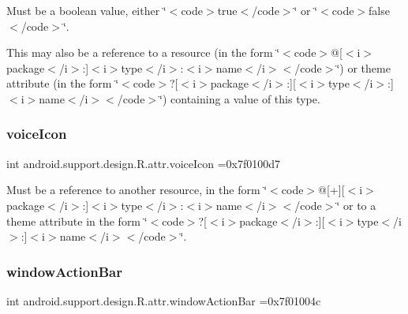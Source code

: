 Must be a boolean value, either \char`\"{}$<$code$>$true$<$/code$>$\char`\"{} or \char`\"{}$<$code$>$false$<$/code$>$\char`\"{}. 

This may also be a reference to a resource (in the form \char`\"{}$<$code$>$@\mbox{[}$<$i$>$package$<$/i$>$\+:\mbox{]}$<$i$>$type$<$/i$>$\+:$<$i$>$name$<$/i$>$$<$/code$>$\char`\"{}) or theme attribute (in the form \char`\"{}$<$code$>$?\mbox{[}$<$i$>$package$<$/i$>$\+:\mbox{]}\mbox{[}$<$i$>$type$<$/i$>$\+:\mbox{]}$<$i$>$name$<$/i$>$$<$/code$>$\char`\"{}) containing a value of this type. \mbox{\label{classandroid_1_1support_1_1design_1_1R_1_1attr_a52019590c44e770bbcf3702f5e7af367}} 
\subsubsection{\texorpdfstring{voice\+Icon}{voiceIcon}}
{\footnotesize\ttfamily int android.\+support.\+design.\+R.\+attr.\+voice\+Icon =0x7f0100d7\hspace{0.3cm}{\ttfamily [static]}}

Must be a reference to another resource, in the form \char`\"{}$<$code$>$@\mbox{[}+\mbox{]}\mbox{[}$<$i$>$package$<$/i$>$\+:\mbox{]}$<$i$>$type$<$/i$>$\+:$<$i$>$name$<$/i$>$$<$/code$>$\char`\"{} or to a theme attribute in the form \char`\"{}$<$code$>$?\mbox{[}$<$i$>$package$<$/i$>$\+:\mbox{]}\mbox{[}$<$i$>$type$<$/i$>$\+:\mbox{]}$<$i$>$name$<$/i$>$$<$/code$>$\char`\"{}. \mbox{\label{classandroid_1_1support_1_1design_1_1R_1_1attr_ad115fed13b20f5c7c7be738211784448}} 
\subsubsection{\texorpdfstring{window\+Action\+Bar}{windowActionBar}}
{\footnotesize\ttfamily int android.\+support.\+design.\+R.\+attr.\+window\+Action\+Bar =0x7f01004c\hspace{0.3cm}{\ttfamily [static]}}

